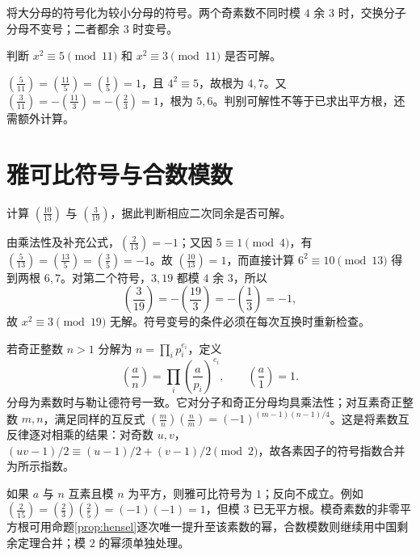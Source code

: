 \documentclass[UTF8,12pt,a4paper,fontset=fandol]{ctexbook}
\begin{document}
将大分母的符号化为较小分母的符号。两个奇素数不同时模 $4$ 余 $3$ 时，交换分子分母不变号；二者都余 $3$ 时变号。

\begin{example}
判断 $x^2\equiv5\pmod{11}$ 和 $x^2\equiv3\pmod{11}$ 是否可解。
\end{example}
\begin{solve}
$\left(\frac5{11}\right)=\left(\frac{11}5\right)=\left(\frac15\right)=1$，且 $4^2\equiv5$，故根为 $4,7$。又 $\left(\frac3{11}\right)=-\left(\frac{11}3\right)=-\left(\frac23\right)=1$，根为 $5,6$。判别可解性不等于已求出平方根，还需额外计算。
\end{solve}

\section{雅可比符号与合数模数}

\begin{example}[分解、互反与取余配合使用]
计算 $\left(\frac{10}{13}\right)$ 与 $\left(\frac3{19}\right)$，据此判断相应二次同余是否可解。
\end{example}
\begin{solve}
由乘法性及补充公式，$\left(\frac2{13}\right)=-1$；又因 $5\equiv1\pmod4$，有 $\left(\frac5{13}\right)=\left(\frac{13}5\right)=\left(\frac35\right)=-1$。故 $\left(\frac{10}{13}\right)=1$，而直接计算 $6^2\equiv10\pmod{13}$ 得到两根 $6,7$。对第二个符号，$3,19$ 都模 $4$ 余 $3$，所以
\[
 \left(\frac3{19}\right)=-\left(\frac{19}3\right)
 =-\left(\frac13\right)=-1,
\]
故 $x^2\equiv3\pmod{19}$ 无解。符号变号的条件必须在每次互换时重新检查。
\end{solve}

若奇正整数 $n>1$ 分解为 $n=\prod_i p_i^{e_i}$，定义
\[
 \left(\frac an\right)=\prod_i\left(\frac a{p_i}\right)^{e_i},
 \qquad \left(\frac a1\right)=1.
\]
分母为素数时与勒让德符号一致。它对分子和奇正分母均具乘法性；对互素奇正整数 $m,n$，满足同样的互反式 $\left(\frac mn\right)\left(\frac nm\right)=(-1)^{(m-1)(n-1)/4}$。这是将素数互反律逐对相乘的结果：对奇数 $u,v$，$(uv-1)/2\equiv(u-1)/2+(v-1)/2\pmod2$，故各素因子的符号指数合并为所示指数。

如果 $a$ 与 $n$ 互素且模 $n$ 为平方，则雅可比符号为 $1$；反向不成立。例如 $\left(\frac2{15}\right)=\left(\frac23\right)\left(\frac25\right)=(-1)(-1)=1$，但模 $3$ 已无平方根。模奇素数的非零平方根可用命题\ref{prop:hensel}逐次唯一提升至该素数的幂，合数模数则继续用中国剩余定理合并；模 $2$ 的幂须单独处理。
\end{document}
